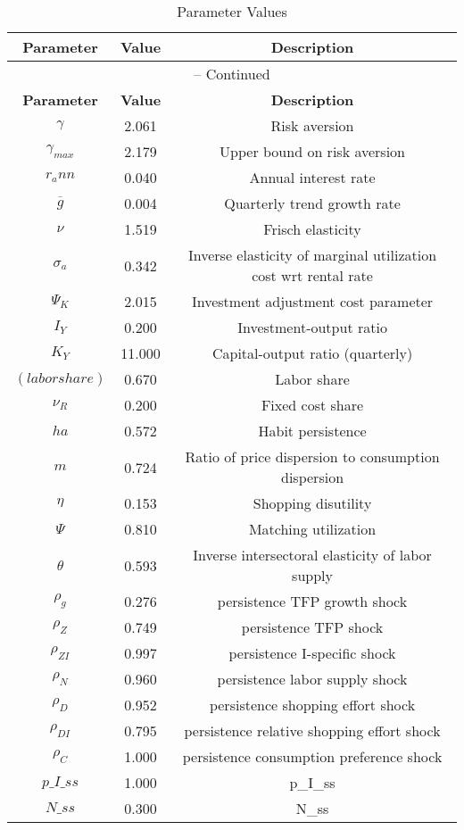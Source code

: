 \begin{center}
\begin{longtable}{ccc}
\caption{Parameter Values}\\%
\toprule%
\multicolumn{1}{c}{\textbf{Parameter}} &
\multicolumn{1}{c}{\textbf{Value}} &
 \multicolumn{1}{c}{\textbf{Description}}\\%
\midrule%
\endfirsthead
\multicolumn{3}{c}{{\tablename} \thetable{} -- Continued}\\%
\midrule%
\multicolumn{1}{c}{\textbf{Parameter}} &
\multicolumn{1}{c}{\textbf{Value}} &
  \multicolumn{1}{c}{\textbf{Description}}\\%
\midrule%
\endhead
${\gamma}$ 	 & 	 2.061 	 & 	 Risk aversion\\
${\gamma_{max}}$ 	 & 	 2.179 	 & 	 Upper bound on risk aversion\\
${r_ann}$ 	 & 	 0.040 	 & 	 Annual interest rate\\
${\overline{g}}$ 	 & 	 0.004 	 & 	 Quarterly trend growth rate\\
$\nu$ 	 & 	 1.519 	 & 	 Frisch elasticity\\
${\sigma_a}$ 	 & 	 0.342 	 & 	 Inverse elasticity of marginal utilization cost wrt rental rate\\
${\Psi_K}$ 	 & 	 2.015 	 & 	 Investment adjustment cost parameter\\
${I_Y}$ 	 & 	 0.200 	 & 	 Investment-output ratio\\
${K_Y}$ 	 & 	 11.000 	 & 	 Capital-output ratio (quarterly)\\
$(labor share)$ 	 & 	 0.670 	 & 	 Labor share\\
${\nu_R}$ 	 & 	 0.200 	 & 	 Fixed cost share\\
${ha}$ 	 & 	 0.572 	 & 	 Habit persistence\\
${m}$ 	 & 	 0.724 	 & 	 Ratio of price dispersion to consumption dispersion\\
${\eta}$ 	 & 	 0.153 	 & 	 Shopping disutility\\
${\Psi}$ 	 & 	 0.810 	 & 	 Matching utilization\\
${\theta}$ 	 & 	 0.593 	 & 	 Inverse intersectoral elasticity of labor supply\\
${\rho_g}$ 	 & 	 0.276 	 & 	 persistence TFP growth shock\\
${\rho_Z}$ 	 & 	 0.749 	 & 	 persistence TFP shock\\
${\rho_{ZI}}$ 	 & 	 0.997 	 & 	 persistence I-specific shock\\
${\rho_N}$ 	 & 	 0.960 	 & 	 persistence labor supply shock\\
${\rho_D}$ 	 & 	 0.952 	 & 	 persistence shopping effort shock\\
${\rho_{DI}}$ 	 & 	 0.795 	 & 	 persistence relative shopping effort shock\\
${\rho_C}$ 	 & 	 1.000 	 & 	 persistence consumption preference shock\\
$p\_I\_ss$ 	 & 	 1.000 	 & 	 p\_I\_ss\\
$N\_ss$ 	 & 	 0.300 	 & 	 N\_ss\\
\bottomrule%
\end{longtable}
\end{center}
